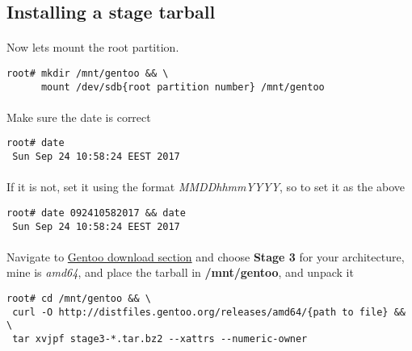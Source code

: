 \documentclass[10pt,a4paper]{article}
\begin{document}
        \newpage
        \subsection{Installing a stage tarball}
            \paragraph{} Now lets mount the root partition.

\begin{lstlisting}[style=BashInputRoot]
root# mkdir /mnt/gentoo && \
      mount /dev/sdb{root partition number} /mnt/gentoo 
\end{lstlisting}
                
            \paragraph{} Make sure the date is correct

\begin{lstlisting}[style=BashInputRoot]
root# date
 Sun Sep 24 10:58:24 EEST 2017
\end{lstlisting}
            
            \paragraph{} If it is not, set it using the format \textit{MMDDhhmmYYYY}, so to set it as the above

\begin{lstlisting}[style=BashInputRoot]
root# date 092410582017 && date
 Sun Sep 24 10:58:24 EEST 2017
\end{lstlisting}
            
            \paragraph{} Navigate to \href{https://www.gentoo.org/downloads/}{Gentoo download section} and choose \textbf{Stage 3} for your architecture, mine is \textit{amd64}, and place the tarball in \textbf{/mnt/gentoo}, and unpack it
            
\begin{lstlisting}[style=BashInputRoot]
root# cd /mnt/gentoo && \
 curl -O http://distfiles.gentoo.org/releases/amd64/{path to file} && \
 tar xvjpf stage3-*.tar.bz2 --xattrs --numeric-owner 
\end{lstlisting}
\end{document}
